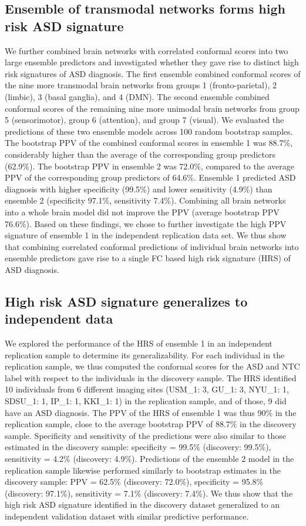 \documentclass[9pt,lineno]{elife}
\begin{document}
\subsection{Ensemble of transmodal networks forms high risk ASD signature}
We further combined brain networks with correlated conformal scores into two large ensemble predictors and investigated whether they gave rise to distinct high risk signatures of ASD diagnosis. The first ensemble combined conformal scores of the nine more transmodal brain networks from groups 1 (fronto-parietal), 2 (limbic), 3 (basal ganglia), and 4 (DMN). The second ensemble combined conformal scores of the remaining nine more unimodal brain networks from group 5 (sensorimotor), group 6 (attention), and group 7 (visual). We evaluated the predictions of these two ensemble models across 100 random bootstrap samples. The bootstrap PPV of the combined conformal scores in ensemble 1 was 88.7\%, considerably higher than the average of the corresponding group predictors (62.9\%). The bootstrap PPV in ensemble 2 was 72.0\%, compared to the average PPV of the corresponding group predictors of 64.6\%. Ensemble 1 predicted ASD diagnosis with higher specificity (99.5\%) and lower sensitivity (4.9\%) than ensemble 2 (specificity 97.1\%, sensitivity 7.4\%). Combining all brain networks into a whole brain model did not improve the PPV (average bootstrap PPV 76.6\%). Based on these findings, we chose to further investigate the high PPV signature of ensemble 1 in the independent replication data set. We thus show that combining correlated conformal predictions of individual brain networks into ensemble predictors gave rise to a single FC based high risk signature (HRS) of ASD diagnosis.


\subsection{High risk ASD signature generalizes to independent data}
We explored the performance of the HRS of ensemble 1 in an independent replication sample to determine its generalizability. For each individual in the replication sample, we thus computed the conformal scores for the ASD and NTC label with respect to the individuals in the discovery sample. The HRS identified 10 individuals from 6 different imaging sites (USM\_1: 3, GU\_1: 3, NYU\_1: 1, SDSU\_1: 1, IP\_1: 1, KKI\_1: 1) in the replication sample, and of those, 9 did have an ASD diagnosis. The PPV of the HRS of ensemble 1 was thus 90\% in the replication sample, close to the average bootstrap PPV of 88.7\% in the discovery sample. Specificity and sensitivity of the predictions were also similar to those estimated in the discovery sample: specificity = 99.5\% (discovery: 99.5\%), sensitivity = 4.2\% (discovery: 4.9\%). Predictions of the ensemble 2 model in the replication sample likewise performed similarly to bootstrap estimates in the discovery sample: PPV = 62.5\% (discovery: 72.0\%), specificity = 95.8\% (discovery: 97.1\%), sensitivity = 7.1\% (discovery: 7.4\%). We thus show that the high risk ASD signature identified in the discovery dataset generalized to an independent validation dataset with similar predictive performance.
\end{document}
